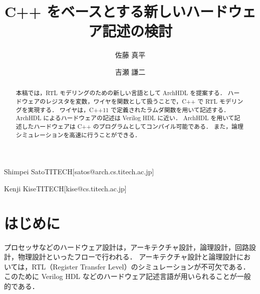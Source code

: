 \documentclass[submit,techreq,noauthor]{ipsj}
\begin{document}
\title{C++ をベースとする新しいハードウェア記述の検討}



\author{佐藤 真平}{Shimpei Sato}{TITECH}[satos@arch.cs.titech.ac.jp]
\author{吉瀬 謙二}{Kenji Kise}{TITECH}[kise@cs.titech.ac.jp]


\begin{abstract}
本稿では，RTL モデリングのための新しい言語として ArchHDL を提案する．
ハードウェアのレジスタを変数，ワイヤを関数として扱うことで，C++ で RTL モデリングを実現する．
ワイヤは，C++11 で定義されたラムダ関数を用いて記述する．
ArchHDL によるハードウェアの記述は Verilog HDL に近い．
ArchHDL を用いて記述したハードウェアは C++ のプログラムとしてコンパイル可能である．
また，論理シミュレーションを高速に行うことができる．
\end{abstract}




\maketitle

\section{はじめに}

プロセッサなどのハードウェア設計は，アーキテクチャ設計，論理設計，回路設計，物理設計といったフローで行われる\cite{ito:2011}．
アーキテクチャ設計と論理設計においては，RTL（Register Transfer Level）のシミュレーションが不可欠である．
このために Verilog HDL などのハードウェア記述言語が用いられることが一般的である．




\end{document}

